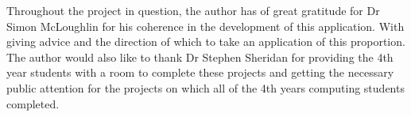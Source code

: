 \def\baselinestretch{1.0}

Throughout the project in question, the author has of great gratitude for Dr Simon McLoughlin for his coherence in the development of this application. With giving advice and the direction of which to take an application of this proportion. The author would also like to thank Dr Stephen Sheridan for providing the 4th year students with a room to complete these projects and getting the necessary public attention for the projects on which all of the 4th years computing students completed.


